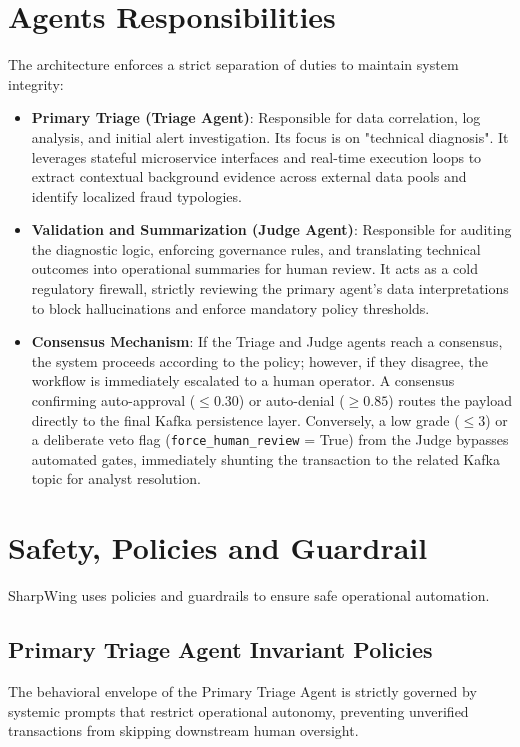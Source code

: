 \documentclass[12pt]{report}
\begin{document}
\section{Agents Responsibilities}
The architecture enforces a strict separation of duties to maintain system integrity:
\begin{itemize}
    \item \textbf{Primary Triage (Triage Agent)}: Responsible for data correlation, log analysis, and initial alert investigation. Its focus is on "technical diagnosis". It leverages stateful microservice interfaces and real-time execution loops to extract contextual background evidence across external data pools and identify localized fraud typologies.
    \item \textbf{Validation and Summarization (Judge Agent)}: Responsible for auditing the diagnostic logic, enforcing governance rules, and translating technical outcomes into operational summaries for human review. It acts as a cold regulatory firewall, strictly reviewing the primary agent's data interpretations to block hallucinations and enforce mandatory policy thresholds.
    \item \textbf{Consensus Mechanism}: If the Triage and Judge agents reach a consensus, the system proceeds according to the policy; however, if they disagree, the workflow is immediately escalated to a human operator. A consensus confirming auto-approval ($\le 0.30$) or auto-denial ($\ge 0.85$) routes the payload directly to the final Kafka persistence layer. Conversely, a low grade ($\le 3$) or a deliberate veto flag (\texttt{force\_human\_review} = True) from the Judge bypasses automated gates, immediately shunting the transaction to the related Kafka topic for analyst resolution.
\end{itemize}

\section{Safety, Policies and Guardrail}
SharpWing uses policies and guardrails to ensure safe operational automation.

\subsection{Primary Triage Agent Invariant Policies}
The behavioral envelope of the Primary Triage Agent is strictly governed by systemic prompts that restrict operational autonomy, preventing unverified transactions from skipping downstream human oversight.
\end{document}
